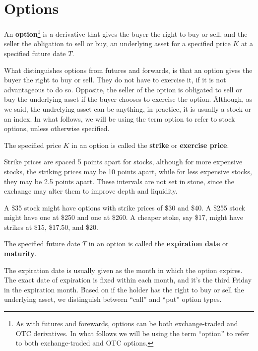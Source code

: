 \section{Options}

\bd[Option]
An \textbf{option}\footnote{As with futures and forewards, options can be both exchange-traded and OTC derivatives. In
what follows we will be using the term ``option'' to refer to both exchange-traded and OTC options.} is a derivative
that gives the buyer the right to buy or sell, and the seller the obligation to sell or buy, an underlying asset for a
specified price $K$ at a specified future date $T$.
\ed

What distinguishes options from futures and forwards, is that an option gives the buyer the right to buy or sell.
They do not have to exercise it, if it is not advantageous to do so. Opposite, the seller of the option is obligated
to sell or buy the underlying asset if the buyer chooses to exercise the option. \v

Although, as we said, the undrelying asset can be anything, in practice, it is usually a stock or an index. In what
follows, we will be using the term option to refer to stock options, unless otherwise specified.

The specified price $K$ in an option is called the \textbf{strike} or \textbf{exercise price}.
\ed

Strike prices are spaced 5 points apart for stocks, although for more expensive stocks, the striking prices may be
10 points apart, while for less expensive stocks, they may be 2.5 points apart. These intervals are not set in
stone, since the exchange may alter them to improve depth and liquidity.

\be
A \$35 stock might have options with strike prices of \$30 and \$40. A \$255 stock might have one at \$250 and one at
\$260. A cheaper stoke, say \$17, might have strikes at \$15, \$17.50, and \$20.
\ee

The specified future date $T$ in an option is called the \textbf{expiration date} or \textbf{maturity}.
\ed

The expiration date is usually given as the month in which the option expires. The exact date of expiration is fixed
within each month, and it's the third Friday in the expiration month. \v

Based on if the holder has the right to buy or sell the underlying asset, we distinguish between ``call'' and ``put''
option types.

